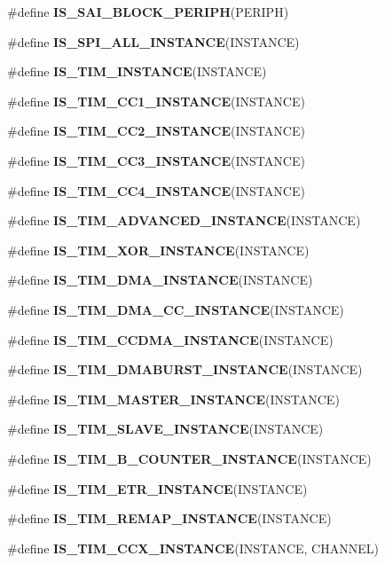 \begin{DoxyCompactItemize}
\item 
\#define {\bfseries I\+S\+\_\+\+S\+A\+I\+\_\+\+B\+L\+O\+C\+K\+\_\+\+P\+E\+R\+I\+PH}(P\+E\+R\+I\+PH)
\item 
\#define {\bfseries I\+S\+\_\+\+S\+P\+I\+\_\+\+A\+L\+L\+\_\+\+I\+N\+S\+T\+A\+N\+CE}(I\+N\+S\+T\+A\+N\+CE)
\item 
\#define {\bfseries I\+S\+\_\+\+T\+I\+M\+\_\+\+I\+N\+S\+T\+A\+N\+CE}(I\+N\+S\+T\+A\+N\+CE)
\item 
\#define {\bfseries I\+S\+\_\+\+T\+I\+M\+\_\+\+C\+C1\+\_\+\+I\+N\+S\+T\+A\+N\+CE}(I\+N\+S\+T\+A\+N\+CE)
\item 
\#define {\bfseries I\+S\+\_\+\+T\+I\+M\+\_\+\+C\+C2\+\_\+\+I\+N\+S\+T\+A\+N\+CE}(I\+N\+S\+T\+A\+N\+CE)
\item 
\#define {\bfseries I\+S\+\_\+\+T\+I\+M\+\_\+\+C\+C3\+\_\+\+I\+N\+S\+T\+A\+N\+CE}(I\+N\+S\+T\+A\+N\+CE)
\item 
\#define {\bfseries I\+S\+\_\+\+T\+I\+M\+\_\+\+C\+C4\+\_\+\+I\+N\+S\+T\+A\+N\+CE}(I\+N\+S\+T\+A\+N\+CE)
\item 
\#define {\bfseries I\+S\+\_\+\+T\+I\+M\+\_\+\+A\+D\+V\+A\+N\+C\+E\+D\+\_\+\+I\+N\+S\+T\+A\+N\+CE}(I\+N\+S\+T\+A\+N\+CE)
\item 
\#define {\bfseries I\+S\+\_\+\+T\+I\+M\+\_\+\+X\+O\+R\+\_\+\+I\+N\+S\+T\+A\+N\+CE}(I\+N\+S\+T\+A\+N\+CE)
\item 
\#define {\bfseries I\+S\+\_\+\+T\+I\+M\+\_\+\+D\+M\+A\+\_\+\+I\+N\+S\+T\+A\+N\+CE}(I\+N\+S\+T\+A\+N\+CE)
\item 
\#define {\bfseries I\+S\+\_\+\+T\+I\+M\+\_\+\+D\+M\+A\+\_\+\+C\+C\+\_\+\+I\+N\+S\+T\+A\+N\+CE}(I\+N\+S\+T\+A\+N\+CE)
\item 
\#define {\bfseries I\+S\+\_\+\+T\+I\+M\+\_\+\+C\+C\+D\+M\+A\+\_\+\+I\+N\+S\+T\+A\+N\+CE}(I\+N\+S\+T\+A\+N\+CE)
\item 
\#define {\bfseries I\+S\+\_\+\+T\+I\+M\+\_\+\+D\+M\+A\+B\+U\+R\+S\+T\+\_\+\+I\+N\+S\+T\+A\+N\+CE}(I\+N\+S\+T\+A\+N\+CE)
\item 
\#define {\bfseries I\+S\+\_\+\+T\+I\+M\+\_\+\+M\+A\+S\+T\+E\+R\+\_\+\+I\+N\+S\+T\+A\+N\+CE}(I\+N\+S\+T\+A\+N\+CE)
\item 
\#define {\bfseries I\+S\+\_\+\+T\+I\+M\+\_\+\+S\+L\+A\+V\+E\+\_\+\+I\+N\+S\+T\+A\+N\+CE}(I\+N\+S\+T\+A\+N\+CE)
\item 
\#define {\bfseries I\+S\+\_\+\+T\+I\+M\+\_\+B\+\_\+\+C\+O\+U\+N\+T\+E\+R\+\_\+\+I\+N\+S\+T\+A\+N\+CE}(I\+N\+S\+T\+A\+N\+CE)
\item 
\#define {\bfseries I\+S\+\_\+\+T\+I\+M\+\_\+\+E\+T\+R\+\_\+\+I\+N\+S\+T\+A\+N\+CE}(I\+N\+S\+T\+A\+N\+CE)
\item 
\#define {\bfseries I\+S\+\_\+\+T\+I\+M\+\_\+\+R\+E\+M\+A\+P\+\_\+\+I\+N\+S\+T\+A\+N\+CE}(I\+N\+S\+T\+A\+N\+CE)
\item 
\#define {\bfseries I\+S\+\_\+\+T\+I\+M\+\_\+\+C\+C\+X\+\_\+\+I\+N\+S\+T\+A\+N\+CE}(I\+N\+S\+T\+A\+N\+CE,  C\+H\+A\+N\+N\+EL)\hypertarget{group___exported__macros_ga6517a51ea79512a42bc53c718a77f18e}{}\label{group___exported__macros_ga6517a51ea79512a42bc53c718a77f18e}


\end{DoxyCompactItemize}
